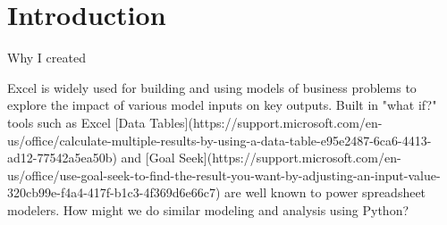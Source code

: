 \documentclass[ited,blindrev]{informs3}              %
\begin{document}
%


\section{Introduction}


Why I created 

Excel is widely used for building and using models of business problems to explore the impact of various model inputs on key outputs. Built in "what if?" tools such as Excel [Data Tables](https://support.microsoft.com/en-us/office/calculate-multiple-results-by-using-a-data-table-e95e2487-6ca6-4413-ad12-77542a5ea50b) and [Goal Seek](https://support.microsoft.com/en-us/office/use-goal-seek-to-find-the-result-you-want-by-adjusting-an-input-value-320cb99e-f4a4-417f-b1c3-4f369d6e66c7) are well known to power spreadsheet modelers. How might we do similar modeling and analysis using Python? 
\end{document}
